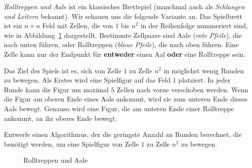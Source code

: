 \documentclass{uebung_cs}
\begin{document}
\begin{aufgabe}
	\emph{Rolltreppen und Aale} ist ein klassisches Brettspiel (manchmal auch als \emph{Schlangen und Leitern} bekannt).
	Wir schauen uns die folgende Variante an.
	Das Spielbrett ist ein $n \times n$ Feld mit Zellen, die von $1$ bis $n^2$ in der Reihenfolge nummeriert sind, wie in Abbildung~\ref{snakesladders} dargestellt.
	Bestimmte Zellpaare sind Aale (\emph{rote Pfeile}), die nach unten führen, oder Rolltreppen (\emph{blaue Pfeile}), die nach oben führen.
	Eine Zelle kann nur der Endpunkt für \textbf{entweder} einen Aal \textbf{oder} eine Rolltreppe sein.

	Das Ziel des Spiels ist es, sich von Zelle $1$ zu Zelle $n^2$ in möglichst wenig Runden zu bewegen.
	Als Erstes wird eine Spielfigur auf das Feld $1$ platziert.
	In jeder Runde kann die Figur um maximal $5$ Zellen nach vorne verschoben werden.
	Wenn die Figur am oberen Ende eines Aals ankommt, wird sie zum unteren Ende dieses Aals bewegt.
	Genauso wird eine Figur, die am unteren Ende einer Rolltreppe ankommt, an ihr oberes Ende bewegt.
	
	Entwerfe einen Algorithmus, der die geringste Anzahl an Runden berechnet, die benötigt werden, um eine Spielfigur von Zelle $1$ zu Zelle $n^2$ zu bewegen.
\end{aufgabe}
\begin{figure}[h]
	\begin{center}
	\end{center}
		\caption{\label{snakesladders}Rolltreppen und Aale}
	\end{figure}
\end{document}
